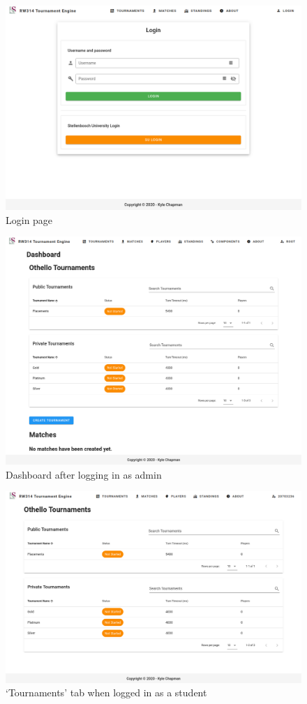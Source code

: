 \documentclass[a4paper, 11pt]{report}
\begin{document}
\begin{figure}[H]
	\centering
	\includegraphics[scale=0.41]{login.png}
	\caption{Login page}
	\label{fig:login}
\end{figure}
\begin{figure}[H]
	\centering
	\includegraphics[scale=0.37]{dashboard-admin.png}
	\caption{Dashboard after logging in as admin}
	\label{fig:dashboard-admin}
\end{figure}
\begin{figure}[H]
	\centering
	\includegraphics[scale=0.33]{all-tournaments-student.png}
	\caption{`Tournaments' tab when logged in as a student}
	\label{fig:all-tourn-student}
\end{figure}
\end{document}

